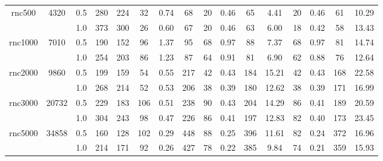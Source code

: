 \documentclass[10pt,journal]{IEEEtran}
\begin{document}
\begin{table}[!t]
\begin{tabular}{c|c|c|c|c|c|c|c|c|c|c|c|c|c|c|c}
\hline

\multicolumn{1}{c|}{\multirow{2}{*}{\hspace*{-0.5em}rnc500\hspace*{-0.5em}}}    &\multicolumn{1}{c|}{\multirow{2}{*}{4320}}   &0.5 &280  &224  &32   &0.74   &68 &20 &0.46  &65   &4.41 &20  &0.46   &61       &10.29  \\
&    &1.0 &373  &300  &26   &0.60   &67  &20 &0.46  &63  &6.00  &18 &0.42  &58     &13.43       \\

\hline

\multicolumn{1}{c|}{\multirow{2}{*}{\hspace*{-1em}rnc1000\hspace*{-1em}}}     &\multicolumn{1}{c|}{\multirow{2}{*}{7010}}  &0.5 &190  &152  &96   &1.37  &95 &68 &0.97 &88 &7.37  &68  &0.97   &81        &14.74   \\
&   &1.0 &254  &203  &86   &1.23   &87  &64 &0.91 &81   &6.90  &62   &0.88  &76       &12.64  \\

\hline

\multicolumn{1}{c|}{\multirow{2}{*}{\hspace*{-1em}rnc2000\hspace*{-1em}}}    &\multicolumn{1}{c|}{\multirow{2}{*}{9860}} &0.5  &199  &159  &54   &0.55   &217  &42 &0.43 &184 &15.21   &42   &0.43   &168       &22.58 \\
  &   &1.0 &268  &214  &52   &0.53   &206   & 38 &0.39 &180  &12.62   &38   &0.39  &171        &16.99 \\

\hline

\multicolumn{1}{c|}{\multirow{2}{*}{\hspace*{-1em}rnc3000\hspace*{-1em}}}     &\multicolumn{1}{c|}{\multirow{2}{*}{20732}}   &0.5  &229  &183  &106   &0.51   &238  &90 &0.43 &204 &14.29  &86   &0.41  &189        &20.59 \\
   &    &1.0 &304  &243  &98   &0.47   &226    &86 &0.41 &197   &12.83  &82   &0.40   &173       &23.45 \\

\hline

\multicolumn{1}{c|}{\multirow{2}{*}{\hspace*{-1em}rnc5000\hspace*{-1em}}}       &\multicolumn{1}{c|}{\multirow{2}{*}{34858}} &0.5   &160  &128  &102  &0.29  &448   &88 &0.25  &396    &11.61  &82   &0.24  &372     &16.96 \\
                                    &             &1.0                                      &214  &171  &92   &0.26   &427 &78 &0.22 &385   &9.84   &74   &0.21   &359      &15.93   \\


\end{tabular}
\end{table}
\end{document}
